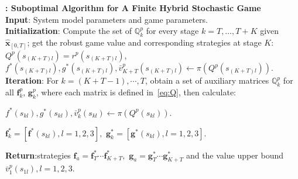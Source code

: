 \begin{alg}
\textbf{: Suboptimal Algorithm for A Finite Hybrid Stochastic Game}\\
\textbf{Input}: System model parameters and game parameters.
\\\textbf{Initialization}:
             Compute the set of $\mathbb{Q}^p_k$ for every stage $k=T,\dots,T+ K$ given $\hat{\mathbf{x}}_{[0,T]}$;
             get the robust game value and corresponding strategies at stage $K$: $Q^{p}(s_{(K+T)l})=r^{p}(s_{(K+T)l})$,
                    $f^{*}(s_{(K+T)l}), g^{*}(s_{(K+T)l}), \bar{v}_{K+T}^{p}(s_{(K+T)l}) \leftarrow \pi(Q^{p}(s_{(K+T)l})).$
\\\textbf{Iteration}: For $k=(K+T-1), \cdots, T$, obtain a set of auxiliary matrices $\mathbb{Q}_{k}^{p}$ for all $\mathbf{f}^{p}_{k}$, $\mathbf{g}^p_k$, where each matrix is defined in~\eqref{eq:Q}, then calculate:

 $f^{*}(s_{kl}), g^{*}(s_{kl}),\bar{v}_{k}^{p}(s_{kl}) \leftarrow \pi(Q^{p}(s_{kl}))$.
 

$\mathbf{f}^*_k=[\mathbf{f}^{*}(s_{kl}),l=1,2,3],$ $ \mathbf{g}^{*}_k=[\mathbf{g}^*(s_{kl}), l=1,2,3].$ 

\textbf{Return}:strategies $\mathbf{f}_{a}=\mathbf{f}^{*}_T\cdots\mathbf{f}^*_{K+T},$ $\mathbf{g}_{a}=\mathbf{g}^{*}_T\cdots\mathbf{g}^*_{K+T}$ and the value upper bound $\bar{v}_1^p(s_{1l}),l=1,2,3$.
\label{finite}
\end{alg}


